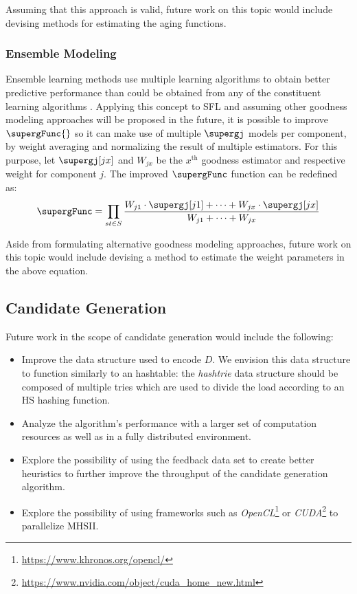 Assuming that this approach is valid, future work on this topic would
include devising methods for estimating the aging functions.

\subsubsection*{Ensemble Modeling}
Ensemble learning methods use multiple learning algorithms to obtain
better predictive performance than could be obtained from any of the
constituent learning algorithms \citep{Opitz99}.
%
Applying this concept to \ac{SFL} and assuming other goodness modeling
approaches will be proposed in the future, it is possible to improve
$\supergFunc{}$ so it can make use of multiple $\supergj$ models per
component, by weight averaging and normalizing the result of multiple
estimators.
%
For this purpose, let $\supergj[jx]$ and $W_{jx}$ be the $x^\text{th}$
goodness estimator and respective weight for component $j$.
%
The improved $\supergFunc$ function can be redefined as:
\begin{equation}
  \supergFunc = \prod_{st \in S} \frac{W_{j1} \cdot \supergj[j1] + \cdots + W_{jx} \cdot \supergj[jx]  }{W_{j1} + \cdots + W_{jx}}
\end{equation}

Aside from formulating alternative goodness modeling approaches,
future work on this topic would include devising a method to estimate
the weight parameters in the above equation.


\subsection{Candidate Generation}
Future work in the scope of candidate generation would include the
following:
\begin{itemize}
\item Improve the data structure used to encode $D$.
  We envision this data structure to function similarly to an
  hashtable: the \emph{hashtrie} data structure should be composed of
  multiple tries which are used to divide the load according to an
  \ac{HS} hashing function.
\item Analyze the algorithm's performance with a larger set of
  computation resources as well as in a fully distributed environment.
\item Explore the possibility of using the feedback data set to create
  better heuristics to further improve the throughput of the candidate
  generation algorithm.
\item Explore the possibility of using frameworks such as
  \emph{OpenCL}\footnote{\url{https://www.khronos.org/opencl/}} or
  \emph{CUDA}\footnote{\url{https://www.nvidia.com/object/cuda_home_new.html}}
  to parallelize \ac{MHSII}.
\end{itemize}



